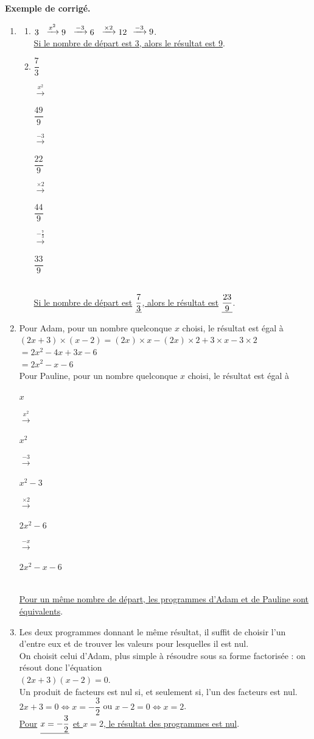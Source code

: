 \begin{activite}
   \textcolor{G1}{
   {\bf Exemple de corrigé.} \smallskip
      \begin{enumerate}
         \item
         \begin{enumerate}
            \item $\parbox{4mm}{3} \xrightarrow{x^2} \parbox{4mm}{9} \xrightarrow{-3} \parbox{4mm}{6} \xrightarrow{\times2} \parbox{5mm}{12} \xrightarrow{-3} 9$. \\
               \uline{Si le nombre de départ est 3, alors le résultat est 9}. \smallskip       
            \item \parbox{4mm}{$\dfrac73$} $\xrightarrow{x^2}$ \; \parbox{6mm}{$\dfrac{49}{9}$} $\xrightarrow{-3}$ \; \parbox{6mm}{$\dfrac{22}{9}$} $\xrightarrow{\times2}$ \;\parbox{5mm}{$\dfrac{44}{9}$} $\xrightarrow{-\frac73}$ \;\parbox{5mm}{$\dfrac{33}{9}$} \\ [1mm]
               \uline{Si le nombre de départ est} $\uline{\dfrac73}$\uline{, alors le résultat est} $\uline{\dfrac{23}{9}}$. \smallskip
         \end{enumerate}    
      \item Pour Adam, pour un nombre quelconque $x$ choisi, le résultat est égal à \\
      $(2x+3)\times(x-2) =(2x)\times x-(2x)\times2+3\times x-3\times2$ \\
      \hspace*{2.55cm} $=2x^2-4x+3x-6$ \\
      \hspace*{2.55cm} $=2x^2-x-6$ \\
         Pour Pauline, pour un nombre quelconque $x$ choisi, le résultat est égal à \\
      \parbox{4mm}{$x$} $\xrightarrow{x^2}$ \; \parbox{4mm}{$x^2$} $\xrightarrow{-3}$ \; \parbox{10mm}{$x^2-3$} $\xrightarrow{\times2}$ \; \parbox{12mm}{$2x^2-6$} $\xrightarrow{-x}$ \; \parbox{18mm}{$2x^2-x-6$} \\ [1mm] 
         \uline{Pour un même nombre de départ, les programmes d'Adam et de Pauline sont équivalents}.    
      \item Les deux programmes donnant le même résultat, il suffit de choisir l'un d'entre eux et de trouver les valeurs pour lesquelles il est nul. \\
         On choisit celui d'Adam, plus simple à résoudre sous sa forme factorisée : on résout donc l'équation \\
         $(2x+3)(x-2) =0$. \\
         Un produit de facteurs est nul si, et seulement si, l'un des facteurs est nul. \\
         $2x+3 =0 \iff x =-\dfrac32$ ou $x-2 =0 \iff x =2$. \\
         \uline{Pour} $\uline{x =-\dfrac32}$ \uline{et $x =2$, le résultat des programmes est nul}.
   \end{enumerate}}
\end{activite}

